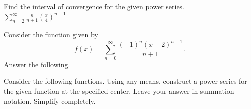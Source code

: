 \documentclass[addpoints]{exam}
\begin{document}
\begin{questions}

\question[10] Find the interval of convergence for the given power series.\\ $\displaystyle\sum_{n=2}^\infty \frac{n}{n+1}\left(\frac{x}{4}\right)^{n-1}$


\newpage

\question[15] Consider the function given by
\[f(x)=\sum_{n=0}^\infty\frac{(-1)^n (x+2)^{n+1}}{n+1}.\]
Answer the following.

\newpage

\question[30] Consider the following functions. Using any means, construct a power series for the given function at the specified center. Leave your answer in summation notation. Simplify completely.

\end{questions}
\end{document}
